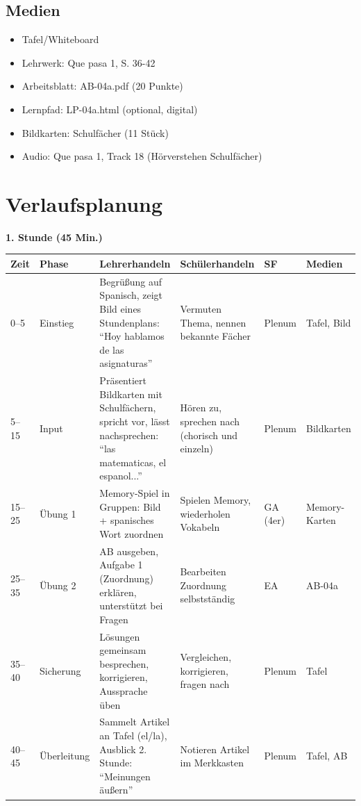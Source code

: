 \documentclass[11pt,a4paper]{article}
\newcommand{\lehrwerk}{Que pasa 1}
\newcommand{\lehrwerkseite}{S. 36-42}
\begin{document}
\subsection{Medien}
\begin{itemize}
    \item Tafel/Whiteboard
    \item Lehrwerk: \lehrwerk, \lehrwerkseite
    \item Arbeitsblatt: AB-04a.pdf (20 Punkte)
    \item Lernpfad: LP-04a.html (optional, digital)
    \item Bildkarten: Schulfächer (11 Stück)
    \item Audio: Que pasa 1, Track 18 (Hörverstehen Schulfächer)
\end{itemize}

\section{Verlaufsplanung}

\textbf{1. Stunde (45 Min.)}

\begin{longtable}{|p{1cm}|p{1.5cm}|p{4cm}|p{3cm}|p{2cm}|p{2cm}|}
\hline
\textbf{Zeit} & \textbf{Phase} & \textbf{Lehrerhandeln} & \textbf{Schülerhandeln} & \textbf{SF} & \textbf{Medien} \\
\hline
\endhead

0--5 & Einstieg & Begrüßung auf Spanisch, zeigt Bild eines Stundenplans: ``Hoy hablamos de las asignaturas'' & Vermuten Thema, nennen bekannte Fächer & Plenum & Tafel, Bild \\
\hline

5--15 & Input & Präsentiert Bildkarten mit Schulfächern, spricht vor, lässt nachsprechen: ``las matematicas, el espanol...'' & Hören zu, sprechen nach (chorisch und einzeln) & Plenum & Bildkarten \\
\hline

15--25 & Übung 1 & Memory-Spiel in Gruppen: Bild + spanisches Wort zuordnen & Spielen Memory, wiederholen Vokabeln & GA (4er) & Memory-Karten \\
\hline

25--35 & Übung 2 & AB ausgeben, Aufgabe 1 (Zuordnung) erklären, unterstützt bei Fragen & Bearbeiten Zuordnung selbstständig & EA & AB-04a \\
\hline

35--40 & Sicherung & Lösungen gemeinsam besprechen, korrigieren, Aussprache üben & Vergleichen, korrigieren, fragen nach & Plenum & Tafel \\
\hline

40--45 & Überleitung & Sammelt Artikel an Tafel (el/la), Ausblick 2. Stunde: ``Meinungen äußern'' & Notieren Artikel im Merkkasten & Plenum & Tafel, AB \\
\hline
\end{longtable}
\end{document}

